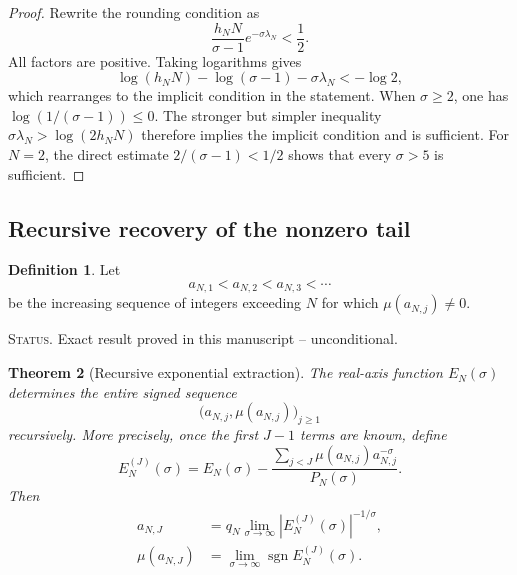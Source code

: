 \documentclass[11pt]{amsart}
\numberwithin{equation}{section}
\theoremstyle{plain}
\newtheorem{theorem}{Theorem}[section]
\theoremstyle{definition}
\newtheorem{definition}[theorem]{Definition}
\theoremstyle{remark}
\newcommand{\1}{\mathbf{1}}
\newcommand{\statusnote}[1]{%
  \par\smallskip\noindent
  \begingroup\footnotesize\textsc{Status.} #1\endgroup
  \par\smallskip}
\begin{document}
\begin{proof}
Rewrite the rounding condition as
\begin{equation}
\frac{h_NN}{\sigma-1}e^{-\sigma\lambda_N}<\frac12.
\label{eq:explicit_threshold_exponential_form}
\end{equation}
All factors are positive.  Taking logarithms gives
\begin{equation}
\log(h_NN)-\log(\sigma-1)-\sigma\lambda_N<-
\log2,
\label{eq:explicit_threshold_log_form}
\end{equation}
which rearranges to the implicit condition in the statement.  When
\(\sigma\geq2\), one has \(\log(1/(\sigma-1))\leq0\).  The stronger but
simpler inequality
\(\sigma\lambda_N>\log(2h_NN)\) therefore implies the implicit condition
and is sufficient.  For $N=2$, the direct estimate
$2/(\sigma-1)<1/2$ shows that every $\sigma>5$ is sufficient.
\end{proof}

\subsection{Recursive recovery of the nonzero tail}
\label{subsec:recursive_tail_recovery}

\begin{definition}
\label{def:tail_support_sequence}
Let
\begin{equation}
a_{N,1}<a_{N,2}<a_{N,3}<\cdots
\label{eq:tail_support_sequence}
\end{equation}
be the increasing sequence of integers exceeding $N$ for which
$\mu(a_{N,j})\neq0$.
\end{definition}

\statusnote{Exact result proved in this manuscript -- unconditional.}
\begin{theorem}[Recursive exponential extraction]
\label{thm:recursive_extraction}
The real-axis function $E_N(\sigma)$ determines the entire signed sequence
\begin{equation}
\bigl(a_{N,j},\mu(a_{N,j})\bigr)_{j\geq1}
\label{eq:entire_tail_sequence}
\end{equation}
recursively.  More precisely, once the first $J-1$ terms are known, define
\begin{equation}
E_N^{(J)}(\sigma)
=
E_N(\sigma)-
\frac{\sum_{j<J}\mu(a_{N,j})a_{N,j}^{-\sigma}}{P_N(\sigma)}.
\label{eq:residual_tail_J}
\end{equation}
Then
\begin{align}
a_{N,J}
&=
q_N\lim_{\sigma\to\infty}
|E_N^{(J)}(\sigma)|^{-1/\sigma},
\label{eq:recursive_position}
\\
\mu(a_{N,J})
&=
\lim_{\sigma\to\infty}
\operatorname{sgn}E_N^{(J)}(\sigma).
\label{eq:recursive_sign}
\end{align}
\end{theorem}
\end{document}
